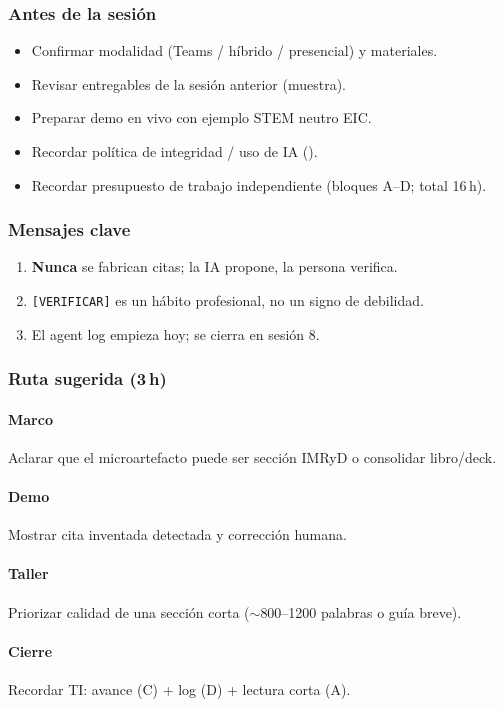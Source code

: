 \subsubsection*{Antes de la sesión}
\begin{itemize}
\item[$\square$] Confirmar modalidad (Teams / híbrido / presencial) y materiales.
\item[$\square$] Revisar entregables de la sesión anterior (muestra).
\item[$\square$] Preparar demo en vivo con ejemplo STEM neutro EIC.
\item[$\square$] Recordar política de integridad / uso de IA (\ceddie).
\item[$\square$] Recordar presupuesto de trabajo independiente (bloques A--D; total 16\,h).
\end{itemize}

\subsubsection*{Mensajes clave}
\begin{enumerate}
\item \textbf{Nunca} se fabrican citas; la IA propone, la persona verifica.
\item \texttt{[VERIFICAR]} es un hábito profesional, no un signo de debilidad.
\item El agent log empieza hoy; se cierra en sesión 8.
\end{enumerate}

\subsubsection*{Ruta sugerida (3\,h)}
\paragraph{Marco} Aclarar que el microartefacto puede ser sección IMRyD o consolidar libro/deck.
\paragraph{Demo} Mostrar cita inventada detectada y corrección humana.
\paragraph{Taller} Priorizar calidad de una sección corta ($\sim$800--1200 palabras o guía breve).
\paragraph{Cierre} Recordar TI: avance (C) + log (D) + lectura corta (A).

